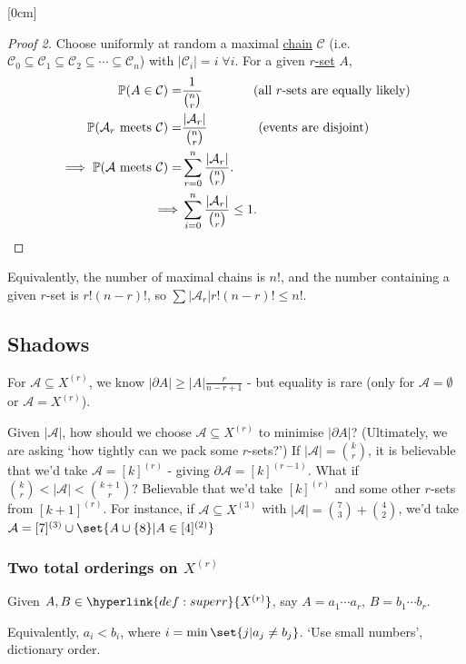 \documentclass{article}
\newcommand{\named}[1]{\textbf{#1}\index{#1}}
\let\subset\subseteq
\begin{document}
[0cm]
\begin{proof}[Proof 2]
  Choose uniformly at random a maximal \hyperlink{def:chain}{chain} $\mathcal{C}$ (i.e.\ $\mathcal{C}_0 \subset \mathcal{C}_1 \subset \mathcal{C}_2 \subset \dotsb \subset \mathcal{C}_n$) with $|\mathcal{C}_i| = i \; \forall i$.
  For a given \hyperlink{def:superr}{$r$-set} $A$,
 \begin{align*}\mathbb{P}(A \in \mathcal{C}) = &\frac{1}{\binom{n}{r}} \qquad \qquad \text{(all $r$-sets are equally likely)} \\
    \mathbb{P}(\mathcal{A}_r \text{ meets } \mathcal{C}) = &\frac{|\mathcal{A}_r|}{\binom{n}{r}} \qquad \qquad \text{(events are disjoint)} \\
    \implies \mathbb{P}(\mathcal{A} \text{ meets }\mathcal{C}) = &\sum_{r=0}^n \frac{|\mathcal{A}_r|}{\binom{n}{r}}. \\
    \implies &\sum_{i=0}^n \frac{|\mathcal{A}_r|}{\binom{n}{r}} \leq 1. \qedhere
  \end{align*}
\end{proof}
\begin{remark}
  Equivalently, the number of maximal chains is $n!$, and the number containing a given $r$-set is $r! (n-r)!$, so $\sum |\mathcal{A}_r| r! (n-r)! \leq n!$.
\end{remark}
\subsection{Shadows}
For $\mathcal{A} \subset X^{(r)}$, we know $|\partial A| \geq |A| \frac{r}{n-r+1}$ - but equality is rare (only for $\mathcal{A} = \emptyset$ or $\mathcal{A} = X^{(r)}$).

Given $|\mathcal{A}|$, how should we choose $\mathcal{A} \subset X^{(r)}$ to minimise $|\partial A|$?
(Ultimately, we are asking `how tightly can we pack some $r$-sets?')
If $|\mathcal{A}| = \binom{k}{r}$, it is believable that we'd take $\mathcal{A} = [k]^{(r)}$ - giving $\partial \mathcal{A} = [k]^{(r-1)}$.
What if $\binom{k}{r} < |\mathcal{A}| < \binom{k+1}{r}$? Believable that we'd take $[k]^{(r)}$ and some other $r$-sets from $[k+1]^{(r)}$.
For instance, if $\mathcal{A} \subset X^{(3)}$ with $|\mathcal{A}| = \binom{7}{3} + \binom{4}{2}$, we'd take $\mathcal{A} = [7]^{(3)} \cup \set{A \cup \{8\} | A\in [4]^{(2)}}$

\subsubsection{Two total orderings on \texorpdfstring{$X^{(r)}$}{X(r)}}
Given $A,B \in \hyperlink{def:superr}{X^{(r)}}$, say $A = a_1 \dotsb a_r$, $B = b_1 \dotsb b_r$.
Equivalently, $a_i < b_i$, where $i = \min\set{j | a_j \neq b_j}$.
`Use small numbers', dictionary order.
\end{document}
